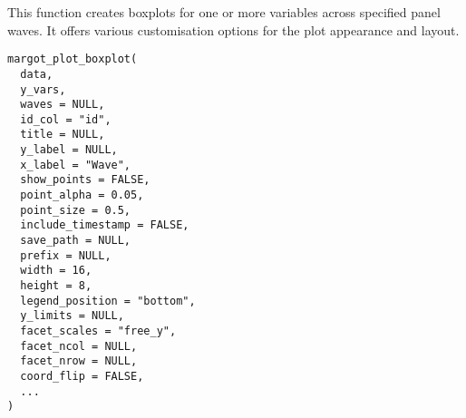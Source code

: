 \documentclass[a4paper]{book}
\begin{document}
%
\begin{Description}
This function creates boxplots for one or more variables across specified panel waves.
It offers various customisation options for the plot appearance and layout.
\end{Description}
%
\begin{Usage}
\begin{verbatim}
margot_plot_boxplot(
  data,
  y_vars,
  waves = NULL,
  id_col = "id",
  title = NULL,
  y_label = NULL,
  x_label = "Wave",
  show_points = FALSE,
  point_alpha = 0.05,
  point_size = 0.5,
  include_timestamp = FALSE,
  save_path = NULL,
  prefix = NULL,
  width = 16,
  height = 8,
  legend_position = "bottom",
  y_limits = NULL,
  facet_scales = "free_y",
  facet_ncol = NULL,
  facet_nrow = NULL,
  coord_flip = FALSE,
  ...
)
\end{verbatim}
\end{Usage}
%
\end{document}
